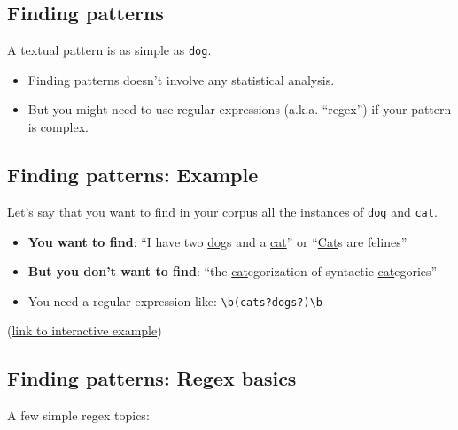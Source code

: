 \documentclass[
  letterpaper,
  DIV=11,
  numbers=noendperiod]{scrartcl}
\begin{document}
\subsection{Finding patterns}\label{finding-patterns}

A textual pattern is as simple as \texttt{dog}.

\begin{itemize}
\item
  Finding patterns doesn't involve any statistical analysis.
\item
  But you might need to use regular expressions (a.k.a. ``regex'') if
  your pattern is complex.
\end{itemize}

\subsection{Finding patterns: Example}\label{finding-patterns-example}

Let's say that you want to find in your corpus all the instances of
\texttt{dog} and \texttt{cat}.

\begin{itemize}
\item
  \textbf{You want to find}: ``I have two \ul{dog}s and a \ul{cat}'' or
  ``\ul{Cat}s are felines''
\item
  \textbf{But you don't want to find}: ``the \ul{cat}egorization of
  syntactic \ul{cat}egories''
\item
  You need a regular expression like:
  \texttt{\textbackslash{}b(cats?\textbar{}dogs?)\textbackslash{}b}
\end{itemize}

{(\href{https://regexr.com/3oqld}{link to interactive example})}

\subsection{Finding patterns: Regex
basics}\label{finding-patterns-regex-basics}

A few simple regex topics:
\end{document}
